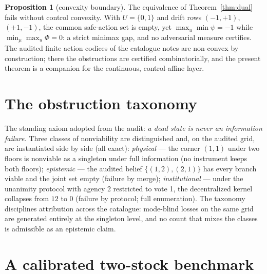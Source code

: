 \documentclass[10pt,twocolumn]{article}
\theoremstyle{definition}
\newtheorem{proposition}{Proposition}
\begin{document}
\begin{proposition}[convexity boundary]\label{prop:gap}
The equivalence of Theorem~\ref{thm:dual} fails without control
convexity. With $U = \{0,1\}$ and drift rows
$(-1,+1)$, $(+1,-1)$, the common safe-action set is empty, yet
$\max_{u}\min\psi = -1$ while $\min_{\mu}\max_{u}\Phi = 0$: a strict
minimax gap, and no adversarial measure certifies. The audited finite
action codices of the catalogue notes are non-convex by construction;
there the obstructions are certified combinatorially, and the present
theorem is a companion for the continuous, control-affine layer.
\end{proposition}

\section{The obstruction taxonomy}

The standing axiom adopted from the audit: \emph{a dead state is never an
information failure.} Three classes of nonviability are distinguished and,
on the audited grid, are instantiated side by side (all exact):
\emph{physical} --- the corner $(1,1)$ under two floors is nonviable as a
singleton under full information (no instrument keeps both floors);
\emph{epistemic} --- the audited belief $\{(1,2),(2,1)\}$ has every branch
viable and the joint set empty (failure by merge); \emph{institutional}
--- under the unanimity protocol with agency 2 restricted to vote 1, the
decentralized kernel collapses from $12$ to $0$ (failure by protocol;
full enumeration). The taxonomy disciplines attribution across the
catalogue: mode-blind losses on the same grid are generated entirely at the singleton level, and no count
that mixes the classes is admissible as an epistemic claim.

\section{A calibrated two-stock benchmark}
\end{document}
